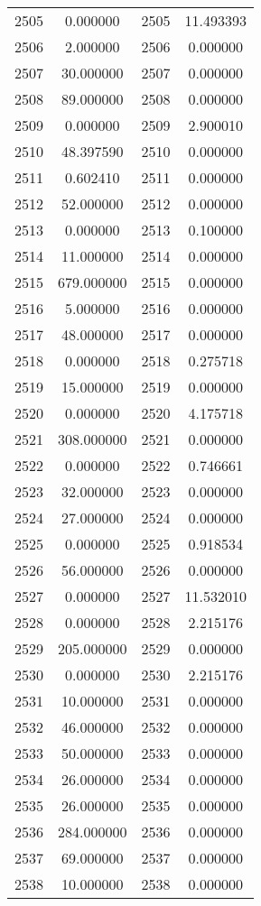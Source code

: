 \documentclass[12pt]{article}
\begin{document}
\begin{longtable}{@{}cccc@{}}
2505 & 0.000000 & 2505 & 11.493393 \\
2506 & 2.000000 & 2506 & 0.000000 \\
2507 & 30.000000 & 2507 & 0.000000 \\
2508 & 89.000000 & 2508 & 0.000000 \\
2509 & 0.000000 & 2509 & 2.900010 \\
2510 & 48.397590 & 2510 & 0.000000 \\
2511 & 0.602410 & 2511 & 0.000000 \\
2512 & 52.000000 & 2512 & 0.000000 \\
2513 & 0.000000 & 2513 & 0.100000 \\
2514 & 11.000000 & 2514 & 0.000000 \\
2515 & 679.000000 & 2515 & 0.000000 \\
2516 & 5.000000 & 2516 & 0.000000 \\
2517 & 48.000000 & 2517 & 0.000000 \\
2518 & 0.000000 & 2518 & 0.275718 \\
2519 & 15.000000 & 2519 & 0.000000 \\
2520 & 0.000000 & 2520 & 4.175718 \\
2521 & 308.000000 & 2521 & 0.000000 \\
2522 & 0.000000 & 2522 & 0.746661 \\
2523 & 32.000000 & 2523 & 0.000000 \\
2524 & 27.000000 & 2524 & 0.000000 \\
2525 & 0.000000 & 2525 & 0.918534 \\
2526 & 56.000000 & 2526 & 0.000000 \\
2527 & 0.000000 & 2527 & 11.532010 \\
2528 & 0.000000 & 2528 & 2.215176 \\
2529 & 205.000000 & 2529 & 0.000000 \\
2530 & 0.000000 & 2530 & 2.215176 \\
2531 & 10.000000 & 2531 & 0.000000 \\
2532 & 46.000000 & 2532 & 0.000000 \\
2533 & 50.000000 & 2533 & 0.000000 \\
2534 & 26.000000 & 2534 & 0.000000 \\
2535 & 26.000000 & 2535 & 0.000000 \\
2536 & 284.000000 & 2536 & 0.000000 \\
2537 & 69.000000 & 2537 & 0.000000 \\
2538 & 10.000000 & 2538 & 0.000000 \\

\end{longtable}
\end{document}
